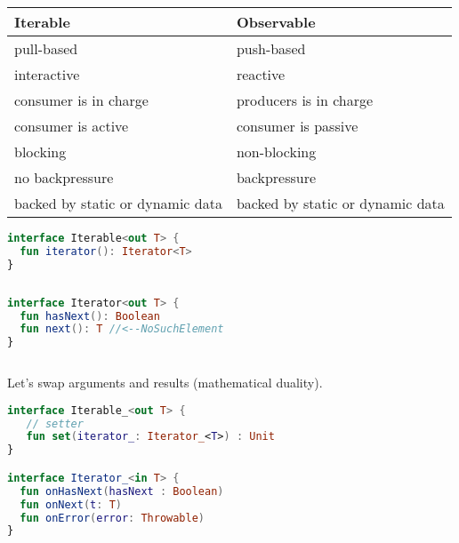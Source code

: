 \documentclass[10pt]{beamer}
\begin{document}
\begin{frame}[fragile]

	\begin{table}
		\centering
		\begin{tabular}{C{4cm}|C{4cm}}
			\toprule
			\textbf{Iterable} & \textbf{Observable}\\
			\midrule
			pull-based & push-based \\ 
			interactive & reactive \\
			consumer is in charge & producers is in charge \\
			consumer is active & consumer is passive \\ 
			blocking & non-blocking \\
			no backpressure & backpressure \\ 
			backed by static or dynamic data & backed by static or dynamic data\\
			\bottomrule
\end{tabular}
	\end{table}

\end{frame}


\begin{frame}[fragile]
\begin{lstlisting}[language=Kotlin, basicstyle=\ttfamily]
interface Iterable<out T> {
  fun iterator(): Iterator<T>
}
\end{lstlisting}
\begin{columns}
\begin{column}{0.7\textwidth}
\begin{lstlisting}[language=Kotlin, basicstyle=\ttfamily]
interface Iterator<out T> {
  fun hasNext(): Boolean 
  fun next(): T //<--NoSuchElement
}
\end{lstlisting}
\end{column}
	\begin{column}{0.3\textwidth}
	\end{column}
\end{columns}
\end{frame}

\begin{frame}[fragile]
	Let's swap arguments and results (mathematical duality).
\begin{lstlisting}[language=Kotlin, basicstyle=\ttfamily]
interface Iterable_<out T> {
   // setter 
   fun set(iterator_: Iterator_<T>) : Unit 
}

interface Iterator_<in T> {
  fun onHasNext(hasNext : Boolean)
  fun onNext(t: T)
  fun onError(error: Throwable)
}
\end{lstlisting}
\end{frame}
\end{document}

